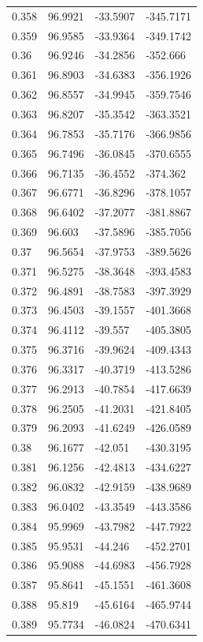 \begin{tabular}{llll}
0.358 & 96.9921 & -33.5907 & -345.7171 \\
0.359 & 96.9585 & -33.9364 & -349.1742 \\
0.36 & 96.9246 & -34.2856 & -352.666 \\
0.361 & 96.8903 & -34.6383 & -356.1926 \\
0.362 & 96.8557 & -34.9945 & -359.7546 \\
0.363 & 96.8207 & -35.3542 & -363.3521 \\
0.364 & 96.7853 & -35.7176 & -366.9856 \\
0.365 & 96.7496 & -36.0845 & -370.6555 \\
0.366 & 96.7135 & -36.4552 & -374.362 \\
0.367 & 96.6771 & -36.8296 & -378.1057 \\
0.368 & 96.6402 & -37.2077 & -381.8867 \\
0.369 & 96.603 & -37.5896 & -385.7056 \\
0.37 & 96.5654 & -37.9753 & -389.5626 \\
0.371 & 96.5275 & -38.3648 & -393.4583 \\
0.372 & 96.4891 & -38.7583 & -397.3929 \\
0.373 & 96.4503 & -39.1557 & -401.3668 \\
0.374 & 96.4112 & -39.557 & -405.3805 \\
0.375 & 96.3716 & -39.9624 & -409.4343 \\
0.376 & 96.3317 & -40.3719 & -413.5286 \\
0.377 & 96.2913 & -40.7854 & -417.6639 \\
0.378 & 96.2505 & -41.2031 & -421.8405 \\
0.379 & 96.2093 & -41.6249 & -426.0589 \\
0.38 & 96.1677 & -42.051 & -430.3195 \\
0.381 & 96.1256 & -42.4813 & -434.6227 \\
0.382 & 96.0832 & -42.9159 & -438.9689 \\
0.383 & 96.0402 & -43.3549 & -443.3586 \\
0.384 & 95.9969 & -43.7982 & -447.7922 \\
0.385 & 95.9531 & -44.246 & -452.2701 \\
0.386 & 95.9088 & -44.6983 & -456.7928 \\
0.387 & 95.8641 & -45.1551 & -461.3608 \\
0.388 & 95.819 & -45.6164 & -465.9744 \\
0.389 & 95.7734 & -46.0824 & -470.6341 \\

\end{tabular}
